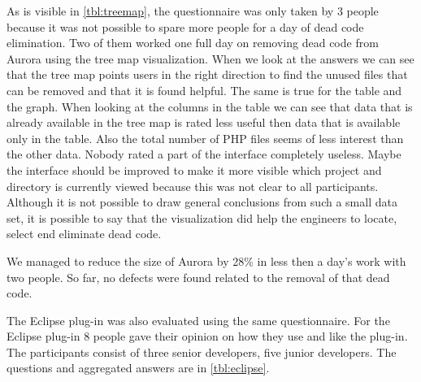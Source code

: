 As is visible in \autoref{tbl:treemap}, the questionnaire was only taken by 3 people because it was not possible to spare more people for a day of dead code elimination. Two of them worked one full day on removing dead code from Aurora using the tree map visualization. When we look at the answers we can see that the tree map points users in the right direction to find the unused files that can be removed and that it is found helpful. The same is true for the table and the graph. When looking at the columns in the table we can see that data that is already available in the tree map is rated less useful then data that is available only in the table. Also the total number of PHP files seems of less interest than the other data. Nobody rated a part of the interface completely useless. Maybe the interface should be improved to make it more visible which project and directory is currently viewed because this was not clear to all participants. Although it is not possible to draw general conclusions from such a small data set, it is possible to say that the visualization did help the engineers to locate, select end eliminate dead code. 

We managed to reduce the size of Aurora by 28\% in less then a day's work with two people. So far, no defects were found related to the  removal of that dead code.

The Eclipse plug-in was also evaluated using the same questionnaire. For the Eclipse plug-in 8 people gave their opinion on how they use and like the plug-in. The participants consist of three senior developers, five junior developers. The questions and aggregated answers are in \autoref{tbl:eclipse}.



